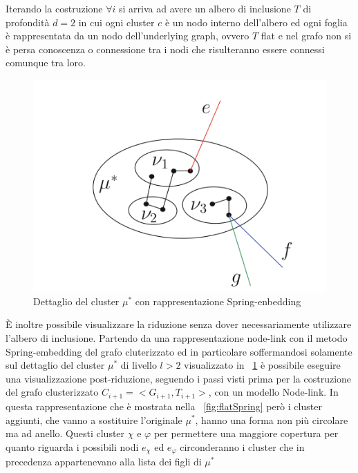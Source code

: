 {Iterando la costruzione $\forall i$ si arriva ad avere un albero di inclusione $T$ di profondità $d=2$ in cui ogni cluster $c$ è un nodo interno dell'albero ed ogni foglia è rappresentata da un nodo dell'underlying graph, ovvero $T$ flat e nel grafo non si è persa conoscenza o connessione tra i nodi che risulteranno essere connessi comunque tra loro.
\begin{figure}[!htb]
	\begin{center}
		\includegraphics[width=1 \linewidth]{figure/dettaglioCluster}
	\end{center}
	\caption{Dettaglio del cluster $\mu^*$ con rappresentazione Spring-enbedding \label{fig:dettaglioCluster}}
\end{figure}
È inoltre possibile visualizzare la riduzione senza dover necessariamente utilizzare l'albero di inclusione. Partendo da una rappresentazione node-link con il metodo Spring-embedding del grafo cluterizzato ed in particolare soffermandosi solamente sul dettaglio del cluster $\mu^*$ di livello $l>2$ visualizzato in \figurename~\ref{fig:dettaglioCluster} è possibile eseguire una visualizzazione post-riduzione, seguendo i passi visti prima per la costruzione del grafo clusterizzato $C_{i+1} = <G_{i+1},T_{i+1}>$, con un modello Node-link. In questa rappresentazione  che è mostrata nella \figurename~\ref{fig:flatSpring} però i cluster aggiunti, che vanno a sostituire l'originale $\mu^*$, hanno una forma non più circolare ma ad anello. Questi cluster $\chi$ e $\varphi$ per permettere una maggiore copertura per quanto riguarda i possibili nodi $e_\chi$ ed $e_\varphi$ circonderanno i cluster che in precedenza appartenevano alla lista dei figli di $\mu^*$
}
